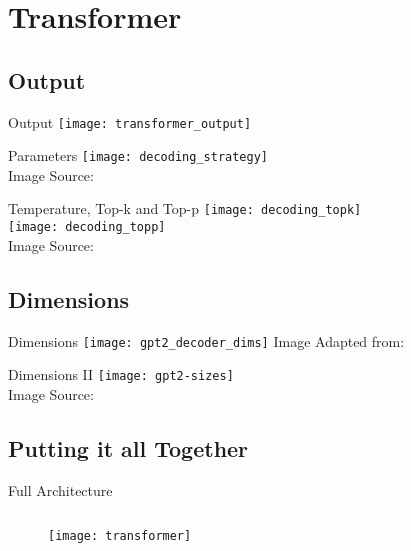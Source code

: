 \section{Transformer}

\subsection{Output}
\begin{frame}[c]{Output}
    \texttt{[image: transformer\_output]}
\end{frame}

\begin{frame}[c]{Parameters}
    \texttt{[image: decoding\_strategy]} \\
    Image Source: \cite{cohereaidocs_topk_2022}
\end{frame}


\begin{frame}[c]{Temperature, Top-k and Top-p}
    \texttt{[image: decoding\_topk]} \\
    \texttt{[image: decoding\_topp]} \\
    Image Source: \cite{cohereaidocs_topk_2022}
\end{frame}

\subsection{Dimensions}
\begin{frame}[c]{Dimensions}
    \texttt{[image: gpt2\_decoder\_dims]}
    Image Adapted from: \cite{mody_gpt_2023}
\end{frame}

\begin{frame}[c]{Dimensions II}
    \texttt{[image: gpt2-sizes]} \\
    Image Source: \cite{alammar_illustrated_2019}
\end{frame}


\subsection{Putting it all Together}
\begin{frame}[c]{Full Architecture}
    \begin{figure}
        \begin{columns}
            \texttt{[image: transformer]}
        \end{columns}
    \end{figure}
\end{frame}


